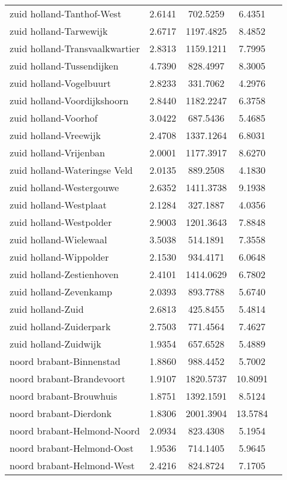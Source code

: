 \begin{longtable}{llccc}
zuid holland-Tanthof-West & 2.6141 & 702.5259 & 6.4351 \\
zuid holland-Tarwewijk & 2.6717 & 1197.4825 & 8.4852 \\
zuid holland-Transvaalkwartier & 2.8313 & 1159.1211 & 7.7995 \\
zuid holland-Tussendijken & 4.7390 & 828.4997 & 8.3005 \\
zuid holland-Vogelbuurt & 2.8233 & 331.7062 & 4.2976 \\
zuid holland-Voordijkshoorn & 2.8440 & 1182.2247 & 6.3758 \\
zuid holland-Voorhof & 3.0422 & 687.5436 & 5.4685 \\
zuid holland-Vreewijk & 2.4708 & 1337.1264 & 6.8031 \\
zuid holland-Vrijenban & 2.0001 & 1177.3917 & 8.6270 \\
zuid holland-Wateringse Veld & 2.0135 & 889.2508 & 4.1830 \\
zuid holland-Westergouwe & 2.6352 & 1411.3738 & 9.1938 \\
zuid holland-Westplaat & 2.1284 & 327.1887 & 4.0356 \\
zuid holland-Westpolder & 2.9003 & 1201.3643 & 7.8848 \\
zuid holland-Wielewaal & 3.5038 & 514.1891 & 7.3558 \\
zuid holland-Wippolder & 2.1530 & 934.4171 & 6.0648 \\
zuid holland-Zestienhoven & 2.4101 & 1414.0629 & 6.7802 \\
zuid holland-Zevenkamp & 2.0393 & 893.7788 & 5.6740 \\
zuid holland-Zuid & 2.6813 & 425.8455 & 5.4814 \\
zuid holland-Zuiderpark & 2.7503 & 771.4564 & 7.4627 \\
zuid holland-Zuidwijk & 1.9354 & 657.6528 & 5.4889 \\
noord brabant-Binnenstad & 1.8860 & 988.4452 & 5.7002 \\
noord brabant-Brandevoort & 1.9107 & 1820.5737 & 10.8091 \\
noord brabant-Brouwhuis & 1.8751 & 1392.1591 & 8.5124 \\
noord brabant-Dierdonk & 1.8306 & 2001.3904 & 13.5784 \\
noord brabant-Helmond-Noord & 2.0934 & 823.4308 & 5.1954 \\
noord brabant-Helmond-Oost & 1.9536 & 714.1405 & 5.9645 \\
noord brabant-Helmond-West & 2.4216 & 824.8724 & 7.1705 \\

\end{longtable}
